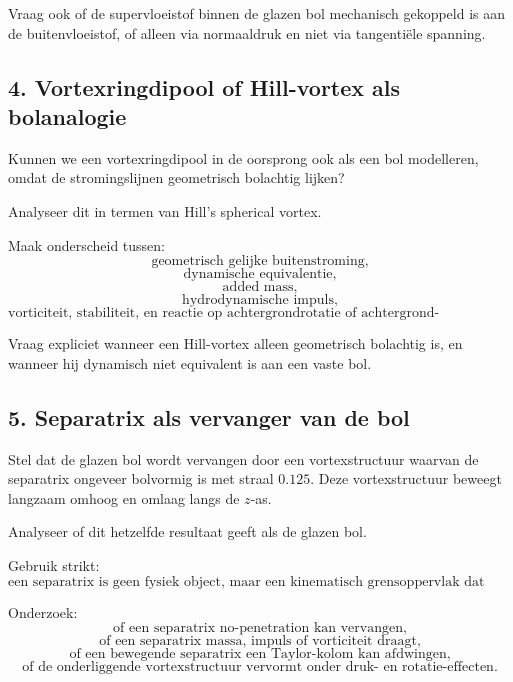 \documentclass[11pt]{article}
\begin{document}
        Vraag ook of de supervloeistof binnen de glazen bol mechanisch gekoppeld is aan de buitenvloeistof, of alleen via normaaldruk en niet via tangentiële spanning.
    
    \subsection{4. Vortexringdipool of Hill-vortex als bolanalogie}
        
        Kunnen we een vortexringdipool in de oorsprong ook als een bol modelleren, omdat de stromingslijnen geometrisch bolachtig lijken?
        
        Analyseer dit in termen van Hill's spherical vortex.
        
        Maak onderscheid tussen:
        \[
            \text{geometrisch gelijke buitenstroming,}
        \]
        \[
            \text{dynamische equivalentie,}
        \]
        \[
            \text{added mass,}
        \]
        \[
            \text{hydrodynamische impuls,}
        \]
        \[
            \text{vorticiteit, stabiliteit, en reactie op achtergrondrotatie of achtergrond-vortexlijnen.}
        \]
        
        Vraag expliciet wanneer een Hill-vortex alleen geometrisch bolachtig is, en wanneer hij dynamisch niet equivalent is aan een vaste bol.
    
    \subsection{5. Separatrix als vervanger van de bol}
        
        Stel dat de glazen bol wordt vervangen door een vortexstructuur waarvan de separatrix ongeveer bolvormig is met straal \(0.125\). Deze vortexstructuur beweegt langzaam omhoog en omlaag langs de \(z\)-as.
        
        Analyseer of dit hetzelfde resultaat geeft als de glazen bol.
        
        Gebruik strikt:
        \[
            \text{een separatrix is geen fysiek object, maar een kinematisch grensoppervlak dat volgt uit de stroming.}
        \]
        
        Onderzoek:
        \[
            \text{of een separatrix no-penetration kan vervangen,}
        \]
        \[
            \text{of een separatrix massa, impuls of vorticiteit draagt,}
        \]
        \[
            \text{of een bewegende separatrix een Taylor-kolom kan afdwingen,}
        \]
        \[
            \text{of de onderliggende vortexstructuur vervormt onder druk- en rotatie-effecten.}
        \]
    
\end{document}
